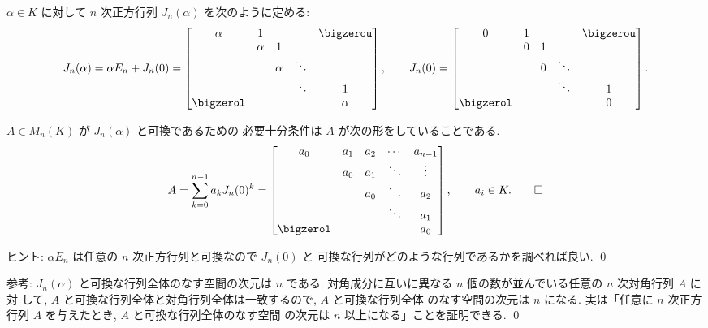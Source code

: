 \documentclass[12pt,twoside]{jarticle}
\begin{document}
$\alpha\in K$ に対して $n$ 次正方行列 $J_n(\alpha)$ を次のように定める: 
\begin{equation*}
  J_n(\alpha) = \alpha E_n + J_n(0) =
  \begin{bmatrix}
    \alpha &    1   &        &        & \bigzerou \\
           & \alpha &    1   &        & \\
           &        & \alpha & \ddots & \\
           &        &        & \ddots & 1 \\
    \bigzerol &     &        &        & \alpha \\
  \end{bmatrix},
  \qquad
  J_n(0) =
  \begin{bmatrix}
    0 & 1 &   &        & \bigzerou \\
      & 0 & 1 &        & \\
      &   & 0 & \ddots & \\
      &   &   & \ddots & 1 \\
    \bigzerol &  &  &  & 0 \\
  \end{bmatrix}.
\end{equation*}
  
\begin{question}
\label{q:A-commutes-J_n(alpha)}
  $A\in M_n(K)$ が $J_n(\alpha)$ と可換であるための
  必要十分条件は $A$ が次の形をしていることである.
  \begin{equation*}
    A = \sum_{k=0}^{n-1} a_k J_n(0)^k = 
    \begin{bmatrix}
      a_0 & a_1 & a_2 & \cdots & a_{n-1} \\
          & a_0 & a_1 & \ddots & \vdots \\
          &     & a_0 & \ddots & a_2 \\
          &     &     & \ddots & a_1 \\
      \bigzerol &  &  &        & a_0 \\
    \end{bmatrix},
    \qquad
    a_i\in K.
    \qed
  \end{equation*}
\end{question}

\noindent
ヒント: $\alpha E_n$ は任意の $n$ 次正方行列と可換なので $J_n(0)$ と
可換な行列がどのような行列であるかを調べれば良い.
\qed

\medskip
\noindent
参考: $J_n(\alpha)$ と可換な行列全体のなす空間の次元は $n$ である.
対角成分に互いに異なる $n$ 個の数が並んでいる任意の $n$ 次対角行列 $A$ に対
して, $A$ と可換な行列全体と対角行列全体は一致するので, $A$ と可換な行列全体
のなす空間の次元は $n$ になる.  
実は「任意に $n$ 次正方行列 $A$ を与えたとき, $A$ と可換な行列全体のなす空間
の次元は $n$ 以上になる」ことを証明できる.
\qed
\end{document}
